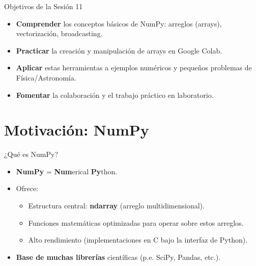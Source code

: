 \documentclass[10pt]{beamer}
\begin{document}
\begin{frame}{Objetivos de la Sesión 11}
  \begin{itemize}
    \item \textbf{Comprender} los conceptos básicos de NumPy: arreglos (arrays), vectorización, broadcasting.
    \item \textbf{Practicar} la creación y manipulación de arrays en Google Colab.
    \item \textbf{Aplicar} estas herramientas a ejemplos numéricos y pequeños problemas de Física/Astronomía.
    \item \textbf{Fomentar} la colaboración y el trabajo práctico en laboratorio.
  \end{itemize}
\end{frame}

\section{Motivación: NumPy}

\begin{frame}{¿Qué es NumPy?}
  \begin{itemize}
    \item \textbf{NumPy} = \textbf{Num}erical \textbf{Py}thon.
    \item Ofrece:
      \begin{itemize}
        \item Estructura central: \textbf{ndarray} (arreglo multidimensional).
        \item Funciones matemáticas optimizadas para operar sobre estos arreglos.
        \item Alto rendimiento (implementaciones en C bajo la interfaz de Python).
      \end{itemize}
    \item \textbf{Base de muchas librerías} científicas (p.e. SciPy, Pandas, etc.).
  \end{itemize}
\end{frame}
\end{document}

